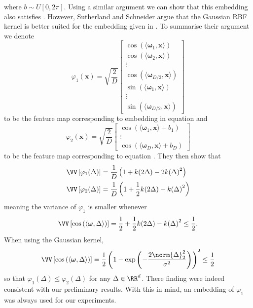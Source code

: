 where $b \sim U \left[ 0,2 \pi \right]$. Using a similar argument we can show that this embedding also satisfies  . However, Sutherland and Schneider \cite{sutherland2015error} argue that the Gaussian RBF kernel is better suited for the embedding given in  . To summarise their argument we denote
\begin{equation} \label{eq: rff_feat_map_1}
    \varphi_1 (\bm{x}) = \sqrt{\frac{2}{D}}
    \begin{bmatrix}
        \cos \left( \langle \bm{\omega}_{1} , \bm{x} \rangle \right)   \\
        \cos \left( \langle \bm{\omega}_{2} , \bm{x} \rangle \right)   \\
        \vdots                                                         \\
        \cos \left( \langle \bm{\omega}_{D/2} , \bm{x} \rangle \right) \\
        \sin \left( \langle \bm{\omega}_{1} , \bm{x} \rangle \right)   \\
        \vdots                                                         \\
        \sin \left( \langle \bm{\omega}_{D/2} , \bm{x} \rangle \right)
    \end{bmatrix}
\end{equation}
to be the feature map corresponding to embedding in equation   and
\begin{equation} \label{eq: rff_feat_map_2}
    \varphi_2 (\bm{x}) = \sqrt{\frac{2}{D}}
    \begin{bmatrix}
        \cos \left( \langle \bm{\omega}_{1} , \bm{x} \rangle + b_1 \right) \\
        \vdots                                                             \\
        \cos \left( \langle \bm{\omega}_{D} , \bm{x} \rangle + b_D \right)
    \end{bmatrix}
\end{equation}
to be the feature map corresponding to equation  . They then show that
\begin{align*}
    \VV \left[ \varphi_1 (\Delta) \right] & = \frac{1}{D} \left( 1 + k (2 \Delta) - 2 {k( \Delta)}^2 \right)           \\
    \VV \left[ \varphi_2 (\Delta) \right] & = \frac{1}{D} \left( 1 + \frac{1}{2} k (2 \Delta) - {k( \Delta)}^2 \right)
\end{align*}
meaning the variance of $\varphi_1$ is smaller whenever
\[
    \VV \left[ \cos \left( \langle \bm{\omega} , \Delta \rangle \right) \right] = \frac{1}{2} + \frac{1}{2} k (2 \Delta) - {k( \Delta)}^2 \leq \frac{1}{2} .
\]
When using the Gaussian kernel,
\[
    \VV \left[ \cos \left( \langle \bm{\omega} , \Delta \rangle \right) \right] = \frac{1}{2} \left( 1 - \exp \left( - \frac{2\norm{\Delta}^2_2}{\sigma^2} \right) \right)^2 \leq \frac{1}{2}
\]
so that $\varphi_1 (\Delta) \leq \varphi_2 (\Delta)$ for any $\Delta \in \RR^d$. There finding were indeed consistent with our preliminary results. With this in mind, an embedding of $\varphi_1$ was always used for our experiments.

